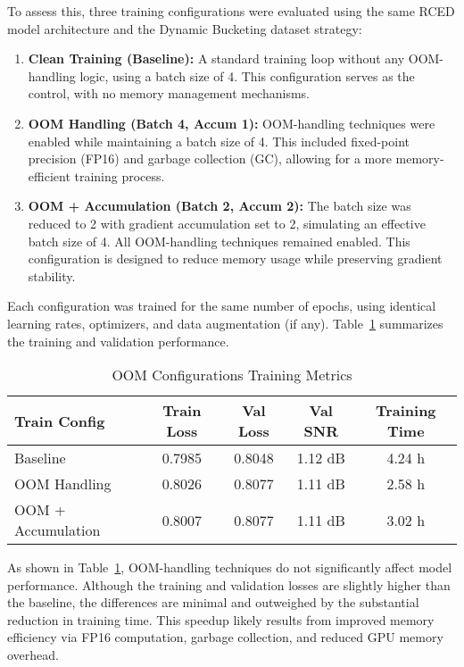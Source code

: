 To assess this, three training configurations were evaluated using the same RCED model architecture and the Dynamic Bucketing dataset strategy:

\begin{enumerate}
    \item \textbf{Clean Training (Baseline):} A standard training loop without any OOM-handling logic, using a batch size of 4. This configuration serves as the control, with no memory management mechanisms.
    
    \item \textbf{OOM Handling (Batch 4, Accum 1):} OOM-handling techniques were enabled while maintaining a batch size of 4. This included fixed-point precision (FP16) and garbage collection (GC), allowing for a more memory-efficient training process.
    
    \item \textbf{OOM + Accumulation (Batch 2, Accum 2):} The batch size was reduced to 2 with gradient accumulation set to 2, simulating an effective batch size of 4. All OOM-handling techniques remained enabled. This configuration is designed to reduce memory usage while preserving gradient stability.
\end{enumerate}

Each configuration was trained for the same number of epochs, using identical learning rates, optimizers, and data augmentation (if any). Table~\ref{tab:oom_training} summarizes the training and validation performance.

\vspace{1em}
\begin{table}[H]
\centering
\caption{OOM Configurations Training Metrics}
\label{tab:oom_training}
\begin{tabular}{|l|c|c|c|c|}
\hline
\textbf{Train Config} & \textbf{Train Loss} & \textbf{Val Loss} & \textbf{Val SNR} & \textbf{Training Time} \\
\hline
Baseline               & 0.7985 & 0.8048 & 1.12 dB & 4.24 h \\
OOM Handling           & 0.8026 & 0.8077 & 1.11 dB & 2.58 h \\
OOM + Accumulation     & 0.8007 & 0.8077 & 1.11 dB & 3.02 h \\
\hline
\end{tabular}
\end{table}

As shown in Table~\ref{tab:oom_training}, OOM-handling techniques do not significantly affect model performance. Although the training and validation losses are slightly higher than the baseline, the differences are minimal and outweighed by the substantial reduction in training time. This speedup likely results from improved memory efficiency via FP16 computation, garbage collection, and reduced GPU memory overhead.

